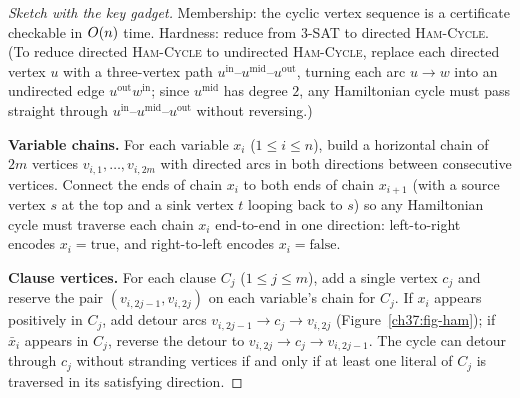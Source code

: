 \begin{proof}[Sketch with the key gadget]
Membership: the cyclic vertex sequence is a certificate checkable in $O(n)$ time.
Hardness: reduce from \textsc{3-SAT} to directed \textsc{Ham-Cycle}. (To reduce directed \textsc{Ham-Cycle} to undirected \textsc{Ham-Cycle}, replace each directed vertex $u$ with a three-vertex path $u^{\mathrm{in}}\text{--}u^{\mathrm{mid}}\text{--}u^{\mathrm{out}}$, turning each arc $u\to w$ into an undirected edge $u^{\mathrm{out}}w^{\mathrm{in}}$; since $u^{\mathrm{mid}}$ has degree $2$, any Hamiltonian cycle must pass straight through $u^{\mathrm{in}}\text{--}u^{\mathrm{mid}}\text{--}u^{\mathrm{out}}$ without reversing.)

\textbf{Variable chains.} For each variable $x_i$ ($1\le i\le n$), build a horizontal chain of $2m$
vertices $v_{i,1},\dots,v_{i,2m}$ with directed arcs in both directions between consecutive vertices. Connect the ends of chain $x_i$ to both ends of chain $x_{i+1}$ (with a source vertex $s$ at the top and a sink vertex $t$ looping back to $s$) so any Hamiltonian cycle must traverse each chain $x_i$ end-to-end in one direction: left-to-right encodes $x_i=\text{true}$, and right-to-left encodes $x_i=\text{false}$.

\textbf{Clause vertices.} For each clause $C_j$ ($1\le j\le m$), add a single vertex $c_j$ and reserve the pair $(v_{i,2j-1}, v_{i,2j})$ on each variable's chain for $C_j$. If $x_i$ appears positively in $C_j$, add detour arcs $v_{i,2j-1}\to c_j\to v_{i,2j}$ (Figure~\ref{ch37:fig-ham}); if $\bar{x}_i$ appears in $C_j$, reverse the detour to $v_{i,2j}\to c_j\to v_{i,2j-1}$. The cycle can detour through $c_j$ without stranding vertices if and only if at least one literal of $C_j$ is traversed in its satisfying direction.
\end{proof}

